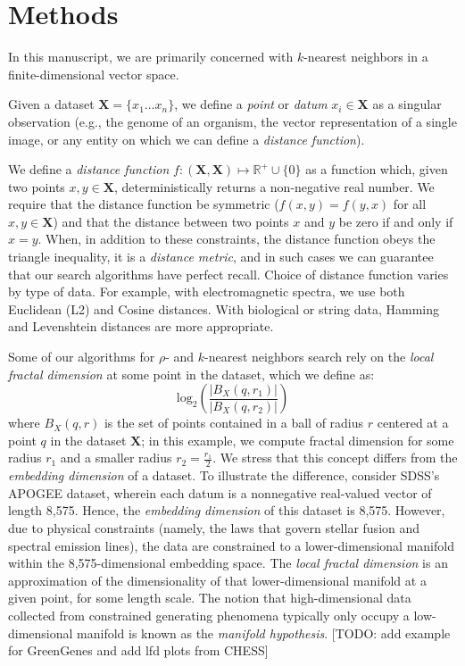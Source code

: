 \section{Methods}
\label{sec:methods}

In this manuscript, we are primarily concerned with $k$-nearest neighbors in a finite-dimensional 
vector space. 

Given a dataset $\textbf{X} = \{x_1 \dots x_n\}$, we define a \emph{point} or \emph{datum} $x_i \in \textbf{X}$ as a singular observation (e.g., the genome of 
an organism, the vector representation of a single image, or any entity on which we can define a \emph{distance function}).

We define a \emph{distance function} $f : (\textbf{X}, \textbf{X}) \mapsto \mathbb{R}^+ \cup \{0\}$ as a function which, 
given two points $x, y \in \textbf{X}$, deterministically returns a non-negative real number. We require that the distance function 
be symmetric ($f(x, y) = f(y, x)$ for all $x, y \in \textbf{X}$) and that the distance between two points $x$ and $y$ be zero if and only if $x = y$. 
When, in addition to these constraints, the distance function obeys
the triangle inequality, it is a \emph{distance metric}, and in such cases we can guarantee that our search algorithms have perfect recall. 
Choice of distance function varies by type of data. For example, with electromagnetic spectra, we use both 
Euclidean (L2) and Cosine distances. With biological or string data, Hamming and Levenshtein distances are more appropriate.


Some of our algorithms for $\rho$- and $k$-nearest neighbors search rely on the \emph{local fractal dimension} at some point in the dataset, 
which we define as: 
$$\text{log}_2 \left( \frac{|B_X(q, r_1)|}{|B_X(q, r_2)|} \right)$$
where $B_X(q, r)$ is the set of points contained in a ball of radius $r$ 
centered at a point $q$ in the dataset $\textbf{X}$; in this example, we compute fractal dimension for some radius $r_1$ and a smaller radius $r_2 = \frac{r_1}{2}$.
We stress that this concept differs from the \emph{embedding dimension} of a dataset. To illustrate the difference,
consider SDSS's APOGEE dataset, wherein each datum is a nonnegative real-valued vector of length 8,575. Hence, the \emph{embedding dimension} of this dataset is 8,575. 
However, due to physical constraints (namely, the laws that govern stellar fusion and spectral emission lines), the data are constrained to a lower-dimensional 
manifold within the 8,575-dimensional embedding space. The \emph{local fractal dimension} is an approximation of the dimensionality of that lower-dimensional manifold at a given point, for some length scale.
The notion that high-dimensional data collected from constrained generating phenomena typically only occupy a low-dimensional manifold is known as the \emph{manifold hypothesis}.
[TODO: add example for GreenGenes and add lfd plots from CHESS]

